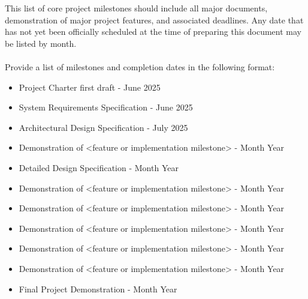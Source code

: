 This list of core project milestones should include all major documents, demonstration of major project features, and associated deadlines. Any date that has not yet been officially scheduled at the time of preparing this document may be listed by month.
\\
\\
Provide a list of milestones and completion dates in the following format:
\begin{itemize}
  \item Project Charter first draft - June 2025
  \item System Requirements Specification - June 2025
  \item Architectural Design Specification - July 2025
  \item Demonstration of <feature or implementation milestone> - Month Year
  \item Detailed Design Specification - Month Year
  \item Demonstration of <feature or implementation milestone> - Month Year
  \item Demonstration of <feature or implementation milestone> - Month Year
  \item Demonstration of <feature or implementation milestone> - Month Year
  \item Demonstration of <feature or implementation milestone> - Month Year
  \item Demonstration of <feature or implementation milestone> - Month Year
  \item Final Project Demonstration - Month Year
\end{itemize}